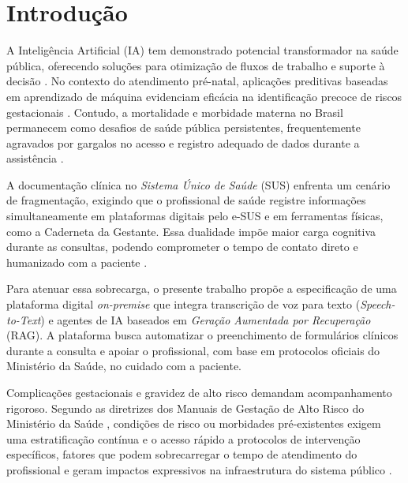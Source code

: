 \documentclass[12pt]{article}
\begin{document}
\section{Introdução}

A Inteligência Artificial (IA) tem demonstrado potencial transformador na saúde pública, oferecendo soluções para otimização de fluxos de trabalho e suporte à decisão \cite{Rajpurkar2022, Cabitza2022}.
No contexto do atendimento pré-natal, aplicações preditivas baseadas em aprendizado de máquina evidenciam eficácia na identificação precoce de riscos gestacionais \cite{HighRiskPregnancy2025, MachineLearning2022}.
Contudo, a mortalidade e morbidade materna no Brasil permanecem como desafios de saúde pública persistentes, frequentemente agravados por gargalos no acesso e registro adequado de dados durante a assistência \cite{AcessoPreNatal2018, Laurenti2010}.

A documentação clínica no \textit{Sistema Único de Saúde} (SUS) enfrenta um cenário de fragmentação, exigindo que o profissional de saúde registre informações simultaneamente em plataformas digitais pelo e-SUS e em ferramentas físicas, como a Caderneta da Gestante.
Essa dualidade impõe maior carga cognitiva durante as consultas, podendo comprometer o tempo de contato direto e humanizado com a paciente \cite{ThemeFilha2014, Rajpurkar2022}.

Para atenuar essa sobrecarga, o presente trabalho propõe a especificação de uma plataforma digital \textit{on-premise} que integra transcrição de voz para texto (\textit{Speech-to-Text}) e agentes de IA baseados em \textit{Geração Aumentada por Recuperação} (RAG).
A plataforma busca automatizar o preenchimento de formulários clínicos durante a consulta e apoiar o profissional, com base em protocolos oficiais do Ministério da Saúde, no cuidado com a paciente.


Complicações gestacionais e gravidez de alto risco demandam acompanhamento rigoroso.
Segundo as diretrizes dos Manuais de Gestação de Alto Risco do Ministério da Saúde \cite{ManualAltoRisco2022, ManualAltoRisco2012}, condições de risco ou morbidades pré-existentes exigem uma estratificação contínua e o acesso rápido a protocolos de intervenção específicos, fatores que podem sobrecarregar o tempo de atendimento do profissional e geram impactos expressivos na infraestrutura do sistema público \cite{MaternalMorbidity2025}.
\end{document}

